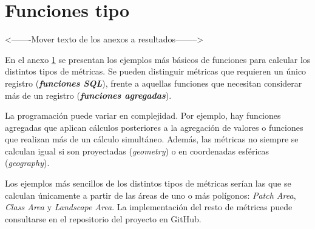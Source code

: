 \chapter{Funciones tipo}\label{anex:funcionestipo}

<-------Mover texto de los anexos a resultados-------->

En el anexo \ref{anex:funcionestipo} se presentan los ejemplos más básicos de funciones para calcular los distintos tipos de métricas. Se pueden distinguir métricas que requieren un único registro (\textbf{\textit{funciones SQL}}), frente a aquellas funciones que necesitan considerar más de un registro (\textbf{\textit{funciones agregadas}}).

La programación puede variar en complejidad. Por ejemplo, hay funciones agregadas que aplican cálculos posteriores a la agregación de valores o funciones que realizan más de un cálculo simultáneo. Además, las métricas no siempre se calculan igual si son proyectadas (\textit{geometry}) o en coordenadas esféricas (\textit{geography}).

Los ejemplos más sencillos de los distintos tipos de métricas serían las que se calculan únicamente a partir de las áreas de uno o más polígonos: \textit{Patch Area}, \textit{Class Area} y \textit{Landscape Area}. La implementación del resto de métricas puede consultarse en el repositorio del proyecto en GitHub.

\pagebreak


\pagebreak

\pagebreak
